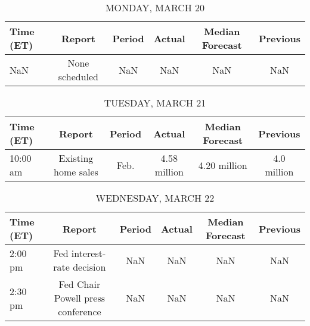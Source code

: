 \documentclass{article}%
\begin{document}
%
\normalsize%


\begin{table}[htbp]%
\caption{MONDAY, MARCH 20}%
\centering%
\begin{adjustbox}{width=1\textwidth}%
\begin{tabular}{lccccc}
\toprule
Time (ET) &         Report & Period & Actual & Median Forecast & Previous \\
\midrule
      NaN & None scheduled &    NaN &    NaN &             NaN &      NaN \\
\bottomrule
\end{tabular}
%
\end{adjustbox}%
\end{table}

%


\begin{table}[htbp]%
\caption{TUESDAY, MARCH 21}%
\centering%
\begin{adjustbox}{width=1\textwidth}%
\begin{tabular}{lccccc}
\toprule
Time (ET) &              Report & Period &       Actual & Median Forecast &    Previous \\
\midrule
 10:00 am & Existing home sales &   Feb. & 4.58 million &    4.20 million & 4.0 million \\
\bottomrule
\end{tabular}
%
\end{adjustbox}%
\end{table}

%


\begin{table}[htbp]%
\caption{WEDNESDAY, MARCH 22}%
\centering%
\begin{adjustbox}{width=1\textwidth}%
\begin{tabular}{lccccc}
\toprule
Time (ET) &                            Report & Period & Actual & Median Forecast & Previous \\
\midrule
  2:00 pm &        Fed interest-rate decision &    NaN &    NaN &             NaN &      NaN \\
  2:30 pm & Fed Chair Powell press conference &    NaN &    NaN &             NaN &      NaN \\
\bottomrule
\end{tabular}
%
\end{adjustbox}%
\end{table}

%
\end{document}
